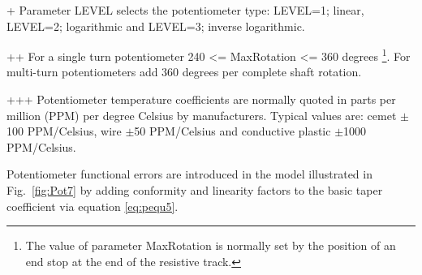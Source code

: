 +  Parameter LEVEL selects the potentiometer type: LEVEL=1; linear, LEVEL=2; logarithmic and LEVEL=3; inverse logarithmic.

++ For a single turn potentiometer 240 <= MaxRotation <= 360 degrees \footnote{The value of parameter MaxRotation is normally set by the position of an end stop at the end of the resistive track.}. For multi-turn potentiometers add 360 degrees per complete shaft rotation.

+++ Potentiometer temperature coefficients are normally quoted in parts per million (PPM) per degree Celsius by manufacturers. Typical values are: cemet $\pm$100 PPM/Celsius, wire $\pm$50 PPM/Celsius and conductive plastic $\pm$1000 PPM/Celsius. 

\bigskip

Potentiometer functional errors are introduced in the model
illustrated in Fig.~\ref{fig:Pot7} by adding conformity and linearity
factors to the basic taper coefficient via equation \eqref{eq:pequ5}.


